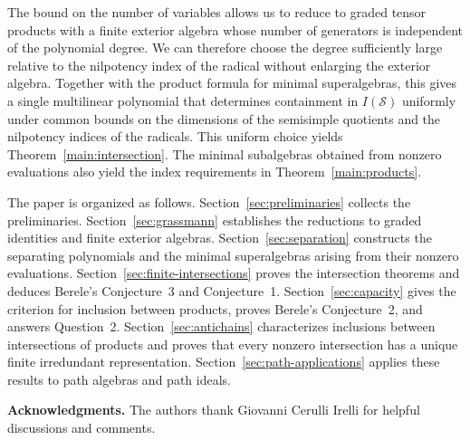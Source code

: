 \documentclass[11pt,reqno]{amsart}
\theoremstyle{definition}
\theoremstyle{remark}
\numberwithin{equation}{section}
\begin{document}
The bound on the number of variables allows us to reduce
to graded tensor products with a finite exterior algebra
whose number of generators is independent of the polynomial
degree. We can therefore choose the degree sufficiently
large relative to the nilpotency index of the radical
without enlarging the exterior algebra.
Together with the product formula for minimal superalgebras,
this gives a single multilinear polynomial that determines
containment in $I(\mathcal S)$ uniformly under common bounds
on the dimensions of the semisimple quotients and the
nilpotency indices of the radicals.
This uniform choice yields Theorem~\ref{main:intersection}.
The minimal subalgebras obtained from nonzero evaluations
also yield the index requirements in
Theorem~\ref{main:products}.




The paper is organized as follows.
Section~\ref{sec:preliminaries} collects the preliminaries.
Section~\ref{sec:grassmann} establishes the reductions to graded identities
and finite exterior algebras.  Section~\ref{sec:separation} constructs the separating
polynomials and the minimal superalgebras arising from
their nonzero evaluations.
Section~\ref{sec:finite-intersections} proves the intersection
theorems and deduces Berele's Conjecture~3 and Conjecture~1.
Section~\ref{sec:capacity} gives the criterion for inclusion
between products, proves Berele's Conjecture~2, and answers Question~2.
Section~\ref{sec:antichains} characterizes inclusions between
intersections of products and proves that every nonzero
intersection has a unique finite irredundant representation.
Section~\ref{sec:path-applications} applies these results
to path algebras and path ideals.



\medskip
\noindent\textbf{Acknowledgments.}
The authors thank Giovanni Cerulli Irelli for helpful discussions and  comments.  
\end{document}
